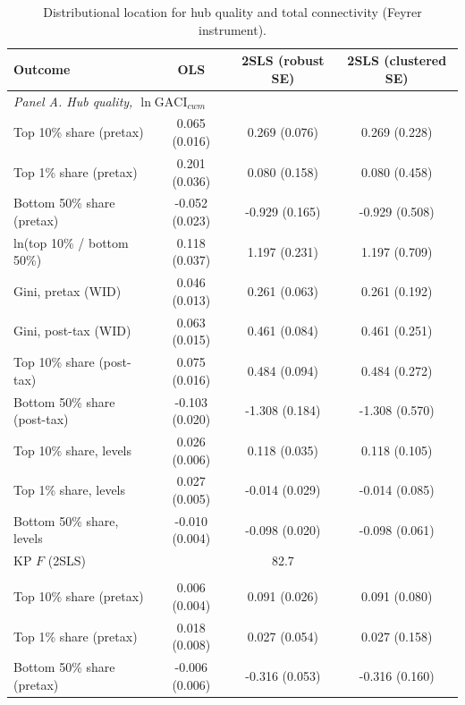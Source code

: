 \begin{table}[H]\centering\caption{Distributional location for hub quality and total connectivity (Feyrer instrument).}\label{tab:a_tails_other}
\begin{threeparttable}\small\begin{tabular}{lccc}
\toprule
Outcome & OLS & 2SLS (robust SE) & 2SLS (clustered SE) \\
\midrule
\multicolumn{4}{l}{\emph{Panel A. Hub quality, $\ln\mathrm{GACI}_{cwm}$}}\\
Top 10\% share (pretax) & 0.065\sym{***} (0.016) & 0.269\sym{***} (0.076) & 0.269 (0.228) \\
Top 1\% share (pretax) & 0.201\sym{***} (0.036) & 0.080 (0.158) & 0.080 (0.458) \\
Bottom 50\% share (pretax) & -0.052\sym{**} (0.023) & -0.929\sym{***} (0.165) & -0.929\sym{*} (0.508) \\
ln(top 10\% / bottom 50\%) & 0.118\sym{***} (0.037) & 1.197\sym{***} (0.231) & 1.197\sym{*} (0.709) \\
Gini, pretax (WID) & 0.046\sym{***} (0.013) & 0.261\sym{***} (0.063) & 0.261 (0.192) \\
Gini, post-tax (WID) & 0.063\sym{***} (0.015) & 0.461\sym{***} (0.084) & 0.461\sym{*} (0.251) \\
Top 10\% share (post-tax) & 0.075\sym{***} (0.016) & 0.484\sym{***} (0.094) & 0.484\sym{*} (0.272) \\
Bottom 50\% share (post-tax) & -0.103\sym{***} (0.020) & -1.308\sym{***} (0.184) & -1.308\sym{**} (0.570) \\
Top 10\% share, levels & 0.026\sym{***} (0.006) & 0.118\sym{***} (0.035) & 0.118 (0.105) \\
Top 1\% share, levels & 0.027\sym{***} (0.005) & -0.014 (0.029) & -0.014 (0.085) \\
Bottom 50\% share, levels & -0.010\sym{***} (0.004) & -0.098\sym{***} (0.020) & -0.098 (0.061) \\
KP $F$ (2SLS) & & 82.7 & \\
\addlinespace
\multicolumn{4}{l}{\emph{Panel B. Total connectivity, $\ln\mathrm{GACI}_{sum}$}}\\
Top 10\% share (pretax) & 0.006 (0.004) & 0.091\sym{***} (0.026) & 0.091 (0.080) \\
Top 1\% share (pretax) & 0.018\sym{**} (0.008) & 0.027 (0.054) & 0.027 (0.158) \\
Bottom 50\% share (pretax) & -0.006 (0.006) & -0.316\sym{***} (0.053) & -0.316\sym{**} (0.160) \\

\end{tabular}
\end{threeparttable}
\end{table}
